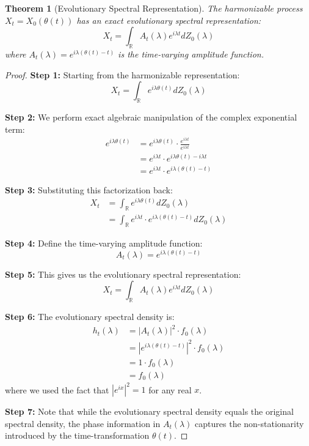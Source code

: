 \documentclass{article}
\newtheorem{theorem}{Theorem}
\begin{document}
\begin{theorem}[Evolutionary Spectral Representation]
The harmonizable process $X_t = X_0(\theta(t))$ has an exact evolutionary spectral representation:
$$X_t = \int_{\mathbb{R}} A_t(\lambda)e^{i\lambda t}dZ_0(\lambda)$$
where $A_t(\lambda) = e^{i\lambda(\theta(t)-t)}$ is the time-varying amplitude function.
\end{theorem}

\begin{proof}
\textbf{Step 1:} Starting from the harmonizable representation:
$$X_t = \int_{\mathbb{R}} e^{i\lambda\theta(t)}dZ_0(\lambda)$$

\textbf{Step 2:} We perform exact algebraic manipulation of the complex exponential term:
\begin{align*}
e^{i\lambda\theta(t)} &= e^{i\lambda\theta(t)} \cdot \frac{e^{i\lambda t}}{e^{i\lambda t}}\\
&= e^{i\lambda t} \cdot e^{i\lambda\theta(t) - i\lambda t}\\
&= e^{i\lambda t} \cdot e^{i\lambda(\theta(t) - t)}
\end{align*}

\textbf{Step 3:} Substituting this factorization back:
\begin{align*}
X_t &= \int_{\mathbb{R}} e^{i\lambda\theta(t)}dZ_0(\lambda)\\
&= \int_{\mathbb{R}} e^{i\lambda t} \cdot e^{i\lambda(\theta(t) - t)}dZ_0(\lambda)
\end{align*}

\textbf{Step 4:} Define the time-varying amplitude function:
$$A_t(\lambda) = e^{i\lambda(\theta(t) - t)}$$

\textbf{Step 5:} This gives us the evolutionary spectral representation:
$$X_t = \int_{\mathbb{R}} A_t(\lambda)e^{i\lambda t}dZ_0(\lambda)$$

\textbf{Step 6:} The evolutionary spectral density is:
\begin{align*}
h_t(\lambda) &= |A_t(\lambda)|^2 \cdot f_0(\lambda)\\
&= |e^{i\lambda(\theta(t) - t)}|^2 \cdot f_0(\lambda)\\
&= 1 \cdot f_0(\lambda)\\
&= f_0(\lambda)
\end{align*}
where we used the fact that $|e^{ix}|^2 = 1$ for any real $x$.

\textbf{Step 7:} Note that while the evolutionary spectral density equals the original spectral density, the phase information in $A_t(\lambda)$ captures the non-stationarity introduced by the time-transformation $\theta(t)$.
\end{proof}
\end{document}
